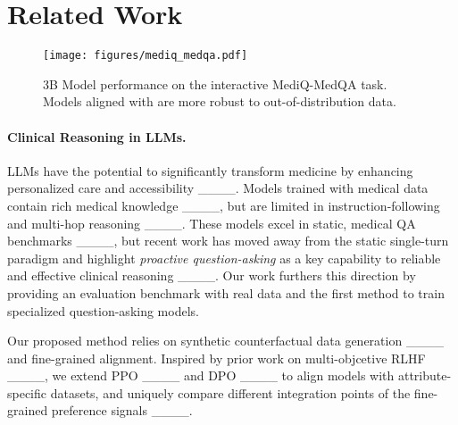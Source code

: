 \section{Related Work}
\begin{figure}[h!]
    \centering
    \texttt{[image: figures/mediq\_medqa.pdf]}\vspace{-3mm}
    \caption{3B Model performance on the interactive MediQ-MedQA task. Models aligned with \methodname are more robust to out-of-distribution data.}
    \label{fig:results:medqa}\vspace{-3mm}
\end{figure}

\paragraph{Clinical Reasoning in LLMs. }

LLMs have the potential to significantly transform medicine by enhancing personalized care and accessibility ____. 
Models trained with medical data contain rich medical knowledge ____, but are limited in instruction-following and multi-hop reasoning ____.
These models excel in static, medical QA benchmarks ____,
but recent work has moved away from the static single-turn paradigm and highlight \emph{proactive question-asking} as a key capability to reliable and effective clinical reasoning ____. Our work furthers this direction by providing an evaluation benchmark with real data and the first method to train specialized question-asking models.


Our proposed method relies on synthetic counterfactual data generation ____ and fine-grained alignment. 
Inspired by prior work on multi-objcetive RLHF ____, we extend PPO ____ and DPO ____ to align models with attribute-specific datasets, and uniquely compare different integration points of the fine-grained preference signals ____.